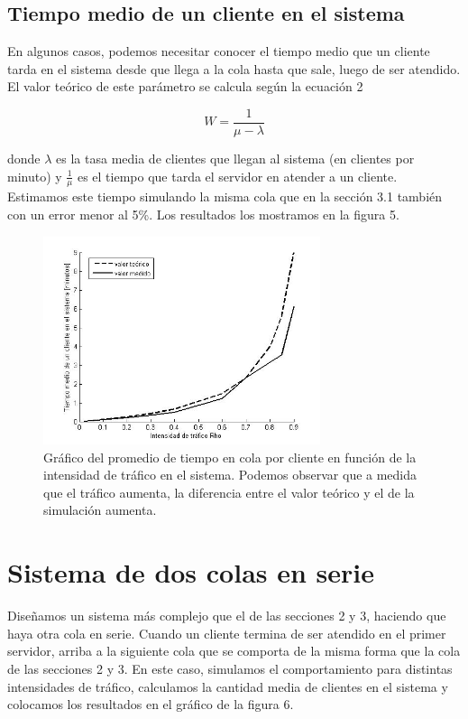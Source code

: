 \documentclass[10pt,journal,compsoc]{IEEEtran}
\begin{document}
\subsection{Tiempo medio de un cliente en el sistema} %
En algunos casos, podemos necesitar conocer el tiempo medio que un cliente tarda en el sistema desde
que llega a la cola hasta que sale, luego de ser atendido. \\
El valor te\'orico de este par\'ametro se calcula seg\'un la ecuaci\'on 2

\begin{equation}
  W = \frac{1}{\mu - \lambda}
\end{equation}

donde $\lambda$ es la tasa media de clientes que llegan al sistema (en clientes por minuto) y
$\frac{1}{\mu}$ es el tiempo que tarda el servidor en atender a un cliente.\\
Estimamos este tiempo simulando la misma cola que en la secci\'on 3.1 tambi\'en con un error menor al 5\%.
Los resultados los mostramos en la figura 5.

\begin{figure}[t]%
\label{fig:puntoccc}
\begin{center}
\centering
\includegraphics[width=3.2in]{plot_w}
\caption{Gr\'afico del promedio de tiempo en cola por cliente en funci\'on de la intensidad de tr\'afico en el sistema. Podemos observar que a medida que el tr\'afico aumenta, la diferencia entre el valor te\'orico y el de la simulaci\'on aumenta.}
\end{center}
\end{figure}

\section{Sistema de dos colas en serie} %
Dise\~namos un sistema m\'as complejo que el de las secciones 2 y 3, haciendo que haya otra cola en serie. 
Cuando un cliente termina de ser atendido en el primer servidor, arriba a la siguiente cola
que se comporta de la misma forma que la cola de las secciones 2 y 3.
En este caso, simulamos el comportamiento para distintas intensidades de tr\'afico, calculamos
la cantidad media de clientes en el sistema y colocamos los resultados en el gr\'afico de la figura
6.
\end{document}
